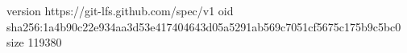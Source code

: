 version https://git-lfs.github.com/spec/v1
oid sha256:1a4b90c22e934aa3d53e417404643d05a5291ab569c7051cf5675c175b9c5bc0
size 119380
